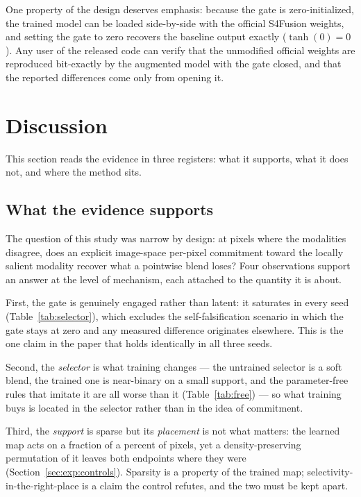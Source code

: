 \documentclass[pdflatex,sn-mathphys-num]{sn-jnl}
\theoremstyle{thmstyleone}%
\theoremstyle{thmstyletwo}%
\theoremstyle{thmstylethree}%
\begin{document}
One property of the design deserves emphasis: because the gate is zero-initialized, the trained model can be loaded side-by-side with the official S4Fusion weights, and setting the gate to zero recovers the baseline output exactly ($\tanh(0) = 0$). Any user of the released code can verify that the unmodified official weights are reproduced bit-exactly by the augmented model with the gate closed, and that the reported differences come only from opening it.

\section{Discussion}\label{sec:discussion}

This section reads the evidence in three registers: what it supports, what it does not, and where the method sits.

\subsection{What the evidence supports}\label{sec:discussion:supports}

The question of this study was narrow by design: at pixels where the modalities disagree, does an explicit image-space per-pixel commitment toward the locally salient modality recover what a pointwise blend loses? Four observations support an answer at the level of mechanism, each attached to the quantity it is about.

First, the gate is genuinely engaged rather than latent: it saturates in every seed (Table~\ref{tab:selector}), which excludes the self-falsification scenario in which the gate stays at zero and any measured difference originates elsewhere. This is the one claim in the paper that holds identically in all three seeds.

Second, the \emph{selector} is what training changes --- the untrained selector is a soft blend, the trained one is near-binary on a small support, and the parameter-free rules that imitate it are all worse than it (Table~\ref{tab:free}) --- so what training buys is located in the selector rather than in the idea of commitment.

Third, the \emph{support} is sparse but its \emph{placement} is not what matters: the learned map acts on a fraction of a percent of pixels, yet a density-preserving permutation of it leaves both endpoints where they were (Section~\ref{sec:exp:controls}). Sparsity is a property of the trained map; selectivity-in-the-right-place is a claim the control refutes, and the two must be kept apart.
\end{document}
